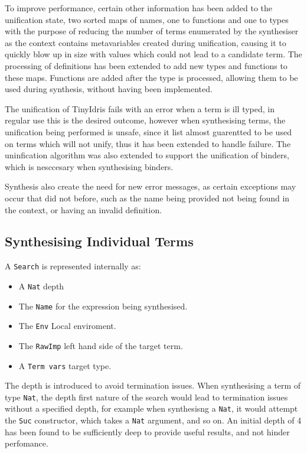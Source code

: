 \documentclass[a4paper]{article}
\begin{document}
To improve performance, certain other information has been added to the unification state, two sorted maps of names, one to functions and one to types
with the purpose of reducing the number of terms enumerated by the synthesiser as the 
context contains metavariables created during unification, causing it to quickly blow up in size  with values which could not lead to 
a candidate term. 
The processing of definitions has been extended to add new types and functions to these maps. Functions are added 
after the type is processed, allowing them to be used during synthesis, without having been implemented. 

The unification of TinyIdris fails with an error when a term is ill typed, 
in regular use this is the desired outcome, however when synthesising 
terms, the unification being performed is unsafe, since it list almost
guarentted to be used on terms which will not unify, thus it has been 
extended to handle failure. The uninfication algorithm was also extended
to support the unification of binders, which is nesccesary when 
synthesising binders.  

Synthesis also create the need for new error messages, as certain exceptions
may occur that did not before, such as the name being provided not being found in the context, 
or having an invalid definition.
\subsection{Synthesising Individual Terms}
\label{sec:orgc850bb8}

A \texttt{Search} is represented internally as: 
\begin{itemize}
\item A \texttt{Nat} depth
\item The \texttt{Name} for the expression being synthesised.
\item The \texttt{Env} Local enviroment.
\item The \texttt{RawImp} left hand side of the target term.
\item A \texttt{Term vars} target type.
\end{itemize}

The depth is introduced to avoid termination issues. When synthesising a term of type \texttt{Nat}, the depth first nature of the 
search would lead to termination issues without a specified depth, for example when synthesisng a \texttt{Nat}, it would attempt 
the \texttt{Suc} constructor, which takes a \texttt{Nat} argument, and so on. An initial depth of 4 has been found to be sufficiently deep 
to provide useful results, and not hinder perfomance. 
\end{document}
